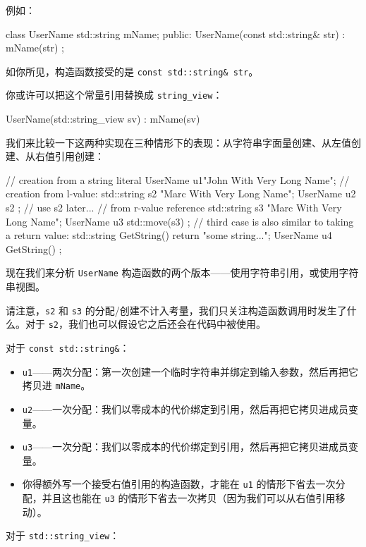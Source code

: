 例如：

\begin{codebox}[cpp]
class UserName {
std::string mName;
public:
UserName(const std::string& str) : mName(str) { }
};
\end{codebox}

如你所见，构造函数接受的是 \texttt{const std::string\& str}。

你或许可以把这个常量引用替换成 \texttt{string\_view}：

\begin{codebox}[cpp]
UserName(std::string_view sv) : mName(sv) { }
\end{codebox}

我们来比较一下这两种实现在三种情形下的表现：从字符串字面量创建、从左值创建、从右值引用创建：

\begin{codebox}[cpp]
// creation from a string literal
UserName u1{"John With Very Long Name"};
// creation from l-value:
std::string s2 {"Marc With Very Long Name"};
UserName u2 { s2 };
// use s2 later...
// from r-value reference
std::string s3 {"Marc With Very Long Name"};
UserName u3 { std::move(s3) };
// third case is also similar to taking a return value:
std::string GetString() { return "some string..."; }
UserName u4 { GetString() };
\end{codebox}

现在我们来分析 \texttt{UserName} 构造函数的两个版本——使用字符串引用，或使用字符串视图。

请注意，\texttt{s2} 和 \texttt{s3} 的分配/创建不计入考量，我们只关注构造函数调用时发生了什么。对于 \texttt{s2}，我们也可以假设它之后还会在代码中被使用。

对于 \texttt{const std::string\&}：

\begin{itemize}
\item \texttt{u1}——两次分配：第一次创建一个临时字符串并绑定到输入参数，然后再把它拷贝进 \texttt{mName}。
\item \texttt{u2}——一次分配：我们以零成本的代价绑定到引用，然后再把它拷贝进成员变量。
\item \texttt{u3}——一次分配：我们以零成本的代价绑定到引用，然后再把它拷贝进成员变量。
\item 你得额外写一个接受右值引用的构造函数，才能在 \texttt{u1} 的情形下省去一次分配，并且这也能在 \texttt{u3} 的情形下省去一次拷贝（因为我们可以从右值引用移动）。
\end{itemize}

对于 \texttt{std::string\_view}：

